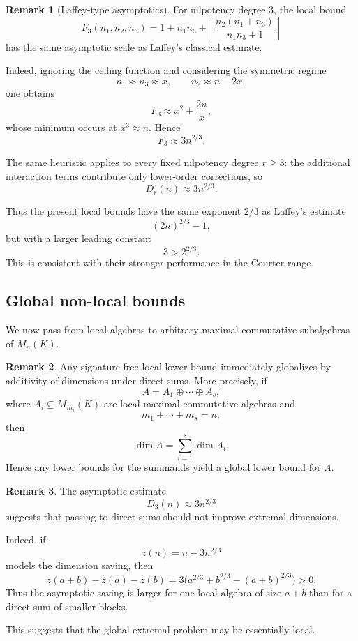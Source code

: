 \documentclass[11pt]{article}
\theoremstyle{remark}
\theoremstyle{plain}
\theoremstyle{definition}
\theoremstyle{myremark}
\newtheorem{remark}{Remark}
\begin{document}
\begin{remark}[Laffey-type asymptotics]
	For nilpotency degree \(3\), the local bound
	\[
	F_3(n_1,n_2,n_3)
	=
	1+n_1n_3+
	\left\lceil
	\frac{n_2(n_1+n_3)}{n_1n_3+1}
	\right\rceil
	\]
	has the same asymptotic scale as Laffey's classical estimate.
	
	Indeed, ignoring the ceiling function and considering the symmetric
	regime
	\[
	n_1\approx n_3\approx x,
	\qquad
	n_2\approx n-2x,
	\]
	one obtains
	\[
	F_3\approx x^2+\frac{2n}{x},
	\]
	whose minimum occurs at \(x^3\approx n\). Hence
	\[
	F_3\approx 3n^{2/3}.
	\]
	
	The same heuristic applies to every fixed nilpotency degree \(r\ge3\): 	the additional interaction terms contribute only lower-order corrections, 	so
	\[
	D_r(n)\approx 3n^{2/3}.
	\]
	
	Thus the present local bounds have the same exponent \(2/3\) as
	Laffey's estimate
	\[
	(2n)^{2/3}-1,
	\]
	but with a larger leading constant
	\[
	3>2^{2/3}.
	\]
	This is consistent with their stronger performance in the Courter range.
\end{remark}

\subsection{Global non-local bounds}

We now pass from local algebras to arbitrary maximal commutative
subalgebras of \(M_n(K)\).\medskip


\begin{remark}
	Any signature-free local lower bound immediately globalizes by additivity
	of dimensions under direct sums. More precisely, if
	\[
	A=A_1\oplus\cdots\oplus A_s,
	\]
	where $A_i\subseteq M_{m_i}(K)$
	are local maximal commutative algebras and
	\[
	m_1+\cdots+m_s=n,
	\]
	then
	\[
	\dim A=\sum_{i=1}^s \dim A_i.
	\]	
	Hence any lower bounds for the summands yield a global lower bound for
	\(A\).
\end{remark}

\begin{remark}
	The asymptotic estimate
	\[
	D_3(n)\approx 3n^{2/3}
	\]
	suggests that passing to direct sums should not improve extremal
	dimensions.
	
	Indeed, if
	\[
	z(n)=n-3n^{2/3}
	\]
	models the dimension saving, then
	\[
	z(a+b)-z(a)-z(b)
	=
	3\bigl(a^{2/3}+b^{2/3}-(a+b)^{2/3}\bigr)>0.
	\]
	Thus the asymptotic saving is larger for one local algebra of size
	\(a+b\) than for a direct sum of smaller blocks.
	
This suggests that the global extremal problem may be essentially local.
\end{remark}
\end{document}
